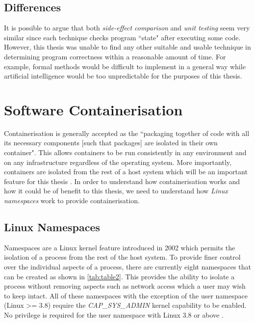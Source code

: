 \documentclass[hidelinks]{report}
\begin{document}
\subsection{Differences}
It is possible to argue that both \textit{side-effect comparison} and \textit{unit testing} seem very similar since each technique checks program ``state" after executing some code. However, this thesis was unable to find any other suitable and usable technique in determining program correctness within a reasonable amount of time. For example, formal methods would be difficult to implement in a general way while artificial intelligence would be too unpredictable for the purposes of this thesis.

\clearpage
\section{Software Containerisation}
Containerisation is generally accepted as the ``packaging together of code with all its necessary components [such that packages] are isolated in their own container". This allows containers to be run consistently in any environment and on any infrastructure regardless of the operating system. More importantly, containers are isolated from the rest of a host system which will be an important feature for this thesis \cite{containerisationGeneral}.
In order to understand how containerisation works and how it could be of benefit to this thesis, we need to understand how \textit{Linux namespaces} work to provide containerisation.

\subsection{Linux Namespaces}
Namespaces are a Linux kernel feature introduced in 2002 which permits the isolation of a process from the rest of the host system. To provide finer control over the individual aspects of a process, there are currently eight namespaces that can be created as shown in \autoref{tab:table2}. This provides the ability to isolate a process without removing aspects such as network access which a user may wish to keep intact. All of these namespaces with the exception of the user namespace (Linux >= 3.8) require the \textit{CAP\_SYS\_ADMIN} kernel capability to be enabled. No privilege is required for the user namespace with Linux 3.8 or above \cite{containerisationManPage}.
\end{document}
